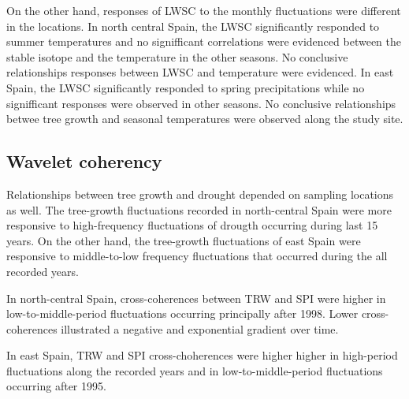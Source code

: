 \documentclass[review,authoryear]{elsarticle}
\begin{document}
On the other hand, responses of \gls{LWSC} to the monthly fluctuations
were different in the locations. In north central Spain, the
\gls{LWSC} significantly responded to summer temperatures and no
signifficant correlations were evidenced between the stable isotope
and the temperature in the other seasons. No conclusive relationships
responses between \gls{LWSC} and temperature were evidenced. In east
Spain, the \gls{LWSC} significantly responded to spring precipitations
while no signifficant responses were observed in other seasons. No
conclusive relationships betwee tree growth and seasonal
temperatures were observed along the study site.

\subsection{Wavelet coherency}

Relationships between tree growth and drought depended on sampling
locations as well. The tree-growth fluctuations recorded in
north-central Spain were more responsive to high-frequency
fluctuations of drougth occurring during last 15 years. On the other
hand, the tree-growth fluctuations of east Spain were responsive to
middle-to-low frequency fluctuations that occurred during the all
recorded years.

In north-central Spain, cross-coherences between \gls{TRW} and
\gls{SPI} were higher in low-to-middle-period fluctuations occurring
principally after 1998. Lower cross-coherences illustrated a negative
and exponential gradient over time.

In east Spain, \gls{TRW} and \gls{SPI} cross-choherences were higher
higher in high-period fluctuations along the recorded years and in
low-to-middle-period fluctuations occurring after 1995.




\newpage
\section{\refname}


\end{document}
